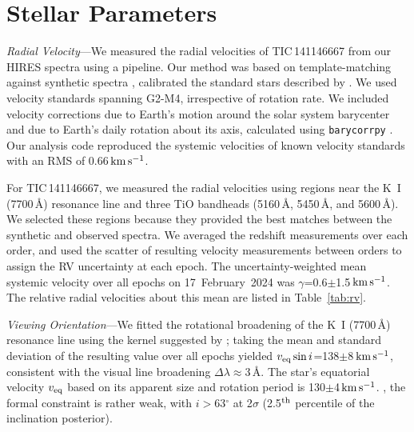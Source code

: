 \documentclass[11pt,twocolumn,tighten,linenumbers]{aastex7}
\newcommand{\kms}{\ensuremath{\rm km\,s^{-1}}}
\begin{document}
\appendix

\section{Stellar Parameters}
\label{sec:stparams}

{\it Radial Velocity}---We measured the radial velocities of
TIC\,141146667 from our HIRES
spectra using a pipeline.  Our method was based on
template-matching against synthetic spectra
\citep{Husser2013}, calibrated the
standard stars described by \citet{Chubak2012}.  We used velocity
standards spanning G2-M4, irrespective of rotation rate.  We included
velocity corrections due to Earth's motion around the solar system
barycenter and due to Earth's daily rotation about its axis,
calculated using \texttt{barycorrpy} \citep{Kanodia2018}.  Our
analysis code reproduced the systemic velocities of known velocity
standards \citep{Chubak2012} with an RMS of 0.66\,\kms.

For TIC\,141146667, we measured the radial velocities using regions
near the K~I (7700\,\AA) resonance line and three TiO bandheads
(5160\,\AA, 5450\,\AA, and 5600\,\AA).  We selected these regions
because they provided the best matches between the synthetic and
observed spectra.  We averaged the redshift measurements over each
order, and used the scatter of resulting velocity measurements between
orders to assign the RV uncertainty at each epoch.  The
uncertainty-weighted mean systemic velocity over all epochs on
17~February~2024 was $\gamma$=0.6$\pm$1.5\,\kms.  The relative radial
velocities about this mean are listed in Table~\ref{tab:rv}.

{\it Viewing Orientation}---We fitted the rotational broadening of the
K~I (7700\,\AA) resonance line using the kernel suggested by
\citet{Gray2008}; taking the mean and standard deviation of the
resulting value over all epochs yielded $v_{\rm eq} \sin
i$=138$\pm$8\,\kms, consistent with the visual line broadening $\Delta
\lambda$$\approx$3\,\AA.  The star's equatorial velocity $v_{\rm eq}$
based on its apparent size and rotation period is 130$\pm$4\,\kms.
, the formal constraint is rather weak, with $i$$>$63$^\circ$
at 2$\sigma$ (2.5$^{\rm th}$ percentile of the inclination posterior).

\end{document}

